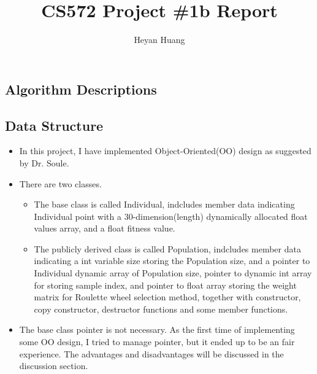 \documentclass{article}
\title{CS572 Project \#1b Report}
\author{Heyan Huang}
\begin{document}
\begin{CJK}{UTF8}{gbsn}
\maketitle


\lstset{language=c++,
numbers=left, 
numberstyle=\tiny, 
tabsize=4,
escapeinside=``, 
extendedchars=false %
}


\section{Algorithm Descriptions}

\subsection{Data Structure}
\begin{itemize}
  \itemsep=-3pt
\item In this project, I have implemented Object-Oriented(OO) design as suggested by Dr. Soule. 

\item There are two classes. 
  \begin{itemize}
    \itemsep=-3pt

  \item The base class is called Individual, indcludes member data indicating Individual point with a 30-dimension(length) dynamically allocated float values array, and a float fitness value.
  \item The publicly derived class is called Population, indcludes member data indicating a int variable size storing the Population size, and a pointer to Individual dynamic array of Population size, pointer to dynamic int array for storing sample index, and pointer to float array storing the weight matrix for Roulette wheel selection method, together with constructor, copy constructor, destructor functions and some member functions.
  \end{itemize}

\item The base class pointer is not necessary. As the first time of implementing some OO design, I tried to manage pointer, but it ended up to be an fair experience. The advantages and disadvantages will be discussed in the discussion section. 
\end{itemize}



\end{CJK}
\end{document}
